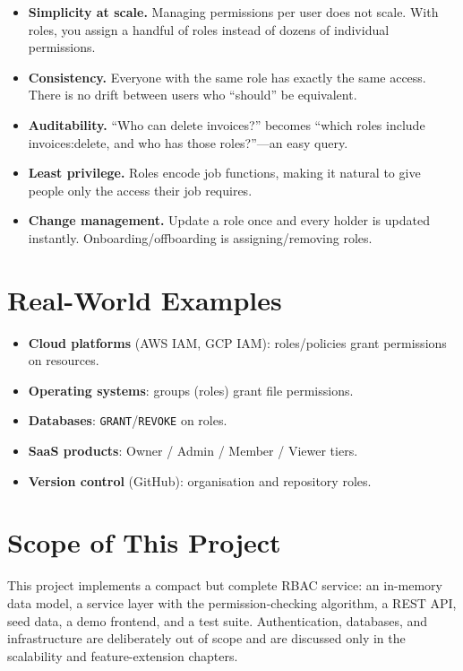 \documentclass[11pt,a4paper]{report}
\begin{document}
\begin{itemize}[leftmargin=1.4em]
  \item \textbf{Simplicity at scale.} Managing permissions per user does not
        scale. With roles, you assign a handful of roles instead of dozens of
        individual permissions.
  \item \textbf{Consistency.} Everyone with the same role has exactly the same
        access. There is no drift between users who ``should'' be equivalent.
  \item \textbf{Auditability.} ``Who can delete invoices?'' becomes ``which
        roles include invoices:delete, and who has those roles?''---an easy
        query.
  \item \textbf{Least privilege.} Roles encode job functions, making it natural
        to give people only the access their job requires.
  \item \textbf{Change management.} Update a role once and every holder is
        updated instantly. Onboarding/offboarding is assigning/removing roles.
\end{itemize}

\section{Real-World Examples}

\begin{itemize}[leftmargin=1.4em]
  \item \textbf{Cloud platforms} (AWS IAM, GCP IAM): roles/policies grant
        permissions on resources.
  \item \textbf{Operating systems}: groups (roles) grant file permissions.
  \item \textbf{Databases}: \texttt{GRANT}/\texttt{REVOKE} on roles.
  \item \textbf{SaaS products}: Owner / Admin / Member / Viewer tiers.
  \item \textbf{Version control} (GitHub): organisation and repository roles.
\end{itemize}

\section{Scope of This Project}

This project implements a compact but complete RBAC service: an in-memory data
model, a service layer with the permission-checking algorithm, a REST API, seed
data, a demo frontend, and a test suite. Authentication, databases, and
infrastructure are deliberately out of scope and are discussed only in the
scalability and feature-extension chapters.
\end{document}
